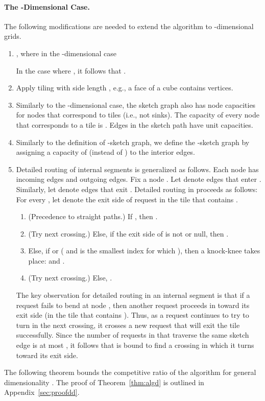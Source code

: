 \documentclass[11pt]{article}
\newenvironment{proof sketch}[1]{\noindent {\emph{Proof sketch of #1:}}}{\hfill \qed}
\begin{document}
\paragraph{The -Dimensional Case.}\label{sec:algd}
The following modifications are needed to extend the algorithm to -dimensional grids.
\begin{enumerate}[(1)]
\item , where in the
    -dimensional case
  
    In the case where , it follows that .


\item Apply tiling with side length , e.g., a face of a cube contains  vertices.

\item Similarly to the -dimensional case, the sketch graph also has node capacities for nodes that correspond to tiles (i.e.,
not sinks). The capacity of every node that corresponds to a tile is .
Edges in the sketch path have unit capacities.

\item Similarly to the definition of -sketch graph, we define the
  -sketch graph by assigning a capacity of  (instead of )
  to the interior edges.

\item Detailed routing of internal segments is generalized as follows. Each node has
   incoming edges and  outgoing edges. Fix a node . Let
   denote edges that enter .  Similarly, let
   denote edges that exit .  Detailed routing in 
  proceeds as follows:
For every , let  denote the exit side of request
     in the tile  that contains .
  \begin{enumerate}
  \item (Precedence to straight paths.) If , then .
  \item (Try next crossing.) Else, if the exit side of  is not  or null, then
    .
  \item Else, if  or ( and  is the smallest index  for which ), then a knock-knee takes place:  and .
  \item (Try next crossing.) Else, .
  \end{enumerate}

  The key observation for detailed routing in an internal segment is that if a
  request  fails to bend at node , then another request proceeds in 
  toward its exit side (in the tile that contains ). Thus, as a request 
  continues to try to turn in the next crossing, it crosses a new request that will
  exit the tile successfully. Since the number of requests in  that traverse the same sketch edge is at most , it follows that  is bound to find a crossing in which it turns
  toward its exit side.

\end{enumerate}
The following theorem bounds the competitive ratio of the algorithm for general dimensionality . The proof of Theorem~\ref{thm:algd} is outlined in Appendix~\ref{sec:proofdd}.
\end{document}
